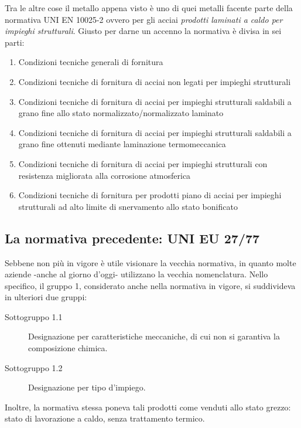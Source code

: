 Tra le altre cose il metallo appena visto è uno di quei metalli facente parte della normativa UNI EN 10025-2 ovvero per gli acciai \textit{prodotti laminati a caldo per impieghi strutturali}. Giusto per darne un accenno la normativa è divisa in sei parti:
\begin{enumerate}
\item Condizioni tecniche generali di fornitura
\item Condizioni tecniche di fornitura di acciai non legati per impieghi strutturali
\item Condizioni tecniche di fornitura di acciai per impieghi strutturali saldabili a grano fine allo stato normalizzato/normalizzato laminato
\item Condizioni tecniche di fornitura di acciai per impieghi strutturali saldabili a grano fine ottenuti mediante laminazione termomeccanica
\item Condizioni tecniche di fornitura di acciai per impieghi strutturali con resistenza migliorata alla corrosione atmosferica
\item Condizioni tecniche di fornitura per prodotti piano di acciai per impieghi strutturali ad alto limite di snervamento allo stato bonificato
\end{enumerate}

\subsection*{La normativa precedente: UNI EU 27/77}
Sebbene non più in vigore è utile visionare la vecchia normativa, in quanto molte aziende -anche al giorno d'oggi- utilizzano la vecchia nomenclatura.
Nello specifico, il gruppo 1, considerato anche nella normativa in vigore, si suddivideva in ulteriori due gruppi:
\begin{description}
\item[Sottogruppo 1.1] Designazione per caratteristiche meccaniche, di cui non si garantiva la composizione chimica.
\item[Sottogruppo 1.2] Designazione per tipo d'impiego. 
\end{description}
Inoltre, la normativa stessa poneva tali prodotti come venduti allo stato grezzo: stato di lavorazione a caldo, senza trattamento termico.

